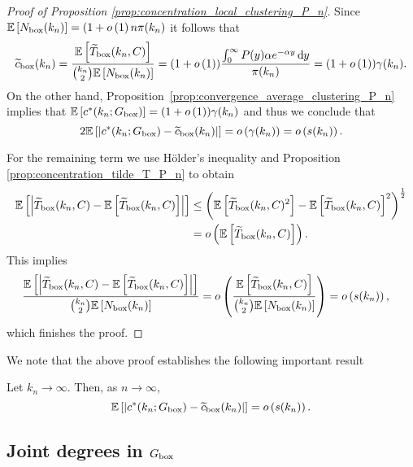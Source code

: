 \begin{proof}[Proof of Proposition \ref{prop:concentration_local_clustering_P_n}]
Since $\mathbb{E}\left[N_{\text{box}}(k_n)\right] = (1+o\left(1\right)n {\pi}(k_n)$ it follows that
\[
	\widetilde{c}_{\text{box}}(k_n) = \frac{\mathbb{E}\left[\widetilde{T}_{\text{box}}(k_n,C)\right]}{\binom{k_n}{2}\mathbb{E}\left[N_{\text{box}}(k_n)\right]}
	= (1+o\left(1\right)) \frac{\int_0^\infty P(y) \alpha e^{-\alpha y} \operatorname{\mathrm{d}\hspace{-2pt}} y}{{\pi}(k_n)}
	= (1 + o\left(1\right)) \gamma(k_n).
\]
On the other hand, Proposition~\ref{prop:convergence_average_clustering_P_n} implies that $\mathbb{E}\left[c^\ast(k_n; G_{\mathrm{box}})\right] = (1+o\left(1\right))\gamma(k_n)$ and thus we conclude that
\[
	2\mathbb{E}\left[\left|c^\ast(k_n; G_{\mathrm{box}}) - \widetilde{c}_{\text{box}}(k_n)\right|\right]
	= o\left(\gamma(k_n)\right) = o\left(s(k_n)\right).	
\]

For the remaining term we use H\"{o}lder's inequality and Proposition \ref{prop:concentration_tilde_T_P_n} to obtain
\begin{align*}
	\mathbb{E}\left[\left|\widetilde{T}_{\text{box}}(k_n,C) - \mathbb{E}\left[\widetilde{T}_{\text{box}}(k_n,C)\right]\right|\right]
	&\le \left(\mathbb{E}\left[\widetilde{T}_{\text{box}}(k_n,C)^2\right] 
		- \mathbb{E}\left[\widetilde{T}_{\text{box}}(k_n,C)\right]^2\right)^{\frac{1}{2}}\\
	&= o\left(\mathbb{E}\left[\widetilde{T}_{\text{box}}(k_n,C)\right]\right).
\end{align*}
This implies
\begin{align*}
	\frac{\mathbb{E}\left[\left|\widetilde{T}_{\text{box}}(k_n,C) - \mathbb{E}\left[\widetilde{T}_{\text{box}}(k_n,C)\right]\right|\right]}
		{\binom{k_n}{2}\mathbb{E}\left[N_{\text{box}}(k_n)\right]}
	&= o\left(\frac{\mathbb{E}\left[\widetilde{T}_{\text{box}}(k_n,C)\right]}{\binom{k_n}{2}\mathbb{E}\left[N_{\text{box}}(k_n)\right]}\right)
	= o\left(s(k_n)\right),
\end{align*}
which finishes the proof.
\end{proof}

We note that the above proof establishes the following important result

\begin{corollary}\label{cor:c_ast_box_2_tilde_c_box}
Let $k_n \to \infty$. Then, as $n \to \infty$,
\[
	\mathbb{E}\left[\left|c^\ast(k_n; G_{\mathrm{box}}) - \widetilde{c}_{\mathrm{box}}(k_n)\right|\right] = o\left(s(k_n)\right).
\]
\end{corollary}

\subsection{Joint degrees in $G_{\mathrm{box}}$}


